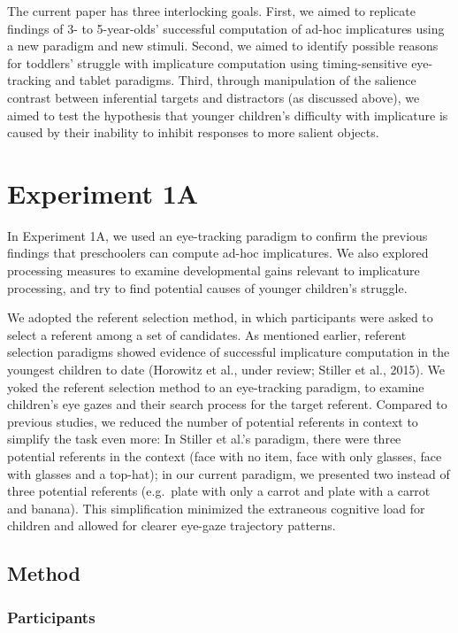 \documentclass[a4paper,man,apacite,floatsintext]{apa6}
\begin{document}
The current paper has three interlocking goals. First, we aimed to
replicate findings of 3- to 5-year-olds' successful computation of
ad-hoc implicatures using a new paradigm and new stimuli. Second, we
aimed to identify possible reasons for toddlers' struggle with
implicature computation using timing-sensitive eye-tracking and tablet
paradigms. Third, through manipulation of the salience contrast between
inferential targets and distractors (as discussed above), we aimed to
test the hypothesis that younger children's difficulty with implicature
is caused by their inability to inhibit responses to more salient
objects.

\section{Experiment 1A}\label{experiment-1a}

In Experiment 1A, we used an eye-tracking paradigm to confirm the
previous findings that preschoolers can compute ad-hoc implicatures. We
also explored processing measures to examine developmental gains
relevant to implicature processing, and try to find potential causes of
younger children's struggle.

We adopted the referent selection method, in which participants were
asked to select a referent among a set of candidates. As mentioned
earlier, referent selection paradigms showed evidence of successful
implicature computation in the youngest children to date (Horowitz et
al., under review; Stiller et al., 2015). We yoked the referent
selection method to an eye-tracking paradigm, to examine children's eye
gazes and their search process for the target referent. Compared to
previous studies, we reduced the number of potential referents in
context to simplify the task even more: In Stiller et al.'s paradigm,
there were three potential referents in the context (face with no item,
face with only glasses, face with glasses and a top-hat); in our current
paradigm, we presented two instead of three potential referents
(e.g.~plate with only a carrot and plate with a carrot and banana). This
simplification minimized the extraneous cognitive load for children and
allowed for clearer eye-gaze trajectory patterns.

\subsection{Method}\label{method}

\subsubsection{Participants}\label{participants}
\end{document}
